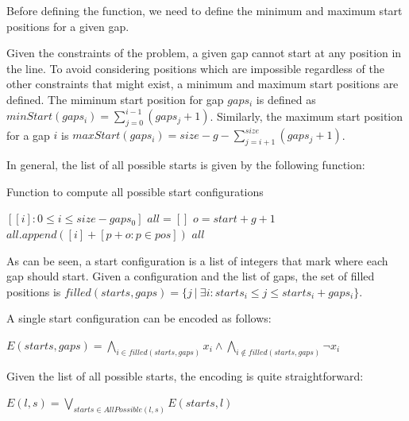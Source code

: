 \documentclass[12pt]{article}
\begin{document}
\noindent Before defining the function, we need to define the minimum and maximum start positions for a given gap.

\noindent Given the constraints of the problem, a given gap cannot start at any position in the line.
To avoid considering positions which are impossible regardless of the other constraints that might exist, a minimum and maximum start positions are defined.
The miminum start position for gap $gaps_i$ is defined as $minStart(gaps_i) = \sum_{j = 0}^{i-1}(gaps_{j}+ 1)$. Similarly, the maximum start position for a gap $i$ is $maxStart(gaps_i) = size - g - \sum_{j=i+1}^{size}(gaps_{j} + 1)$.

In general, the list of all possible starts is given by the following function:

\begin{algorithm}
\caption{Function to compute all possible start configurations}\label{alg:allPossible}
\begin{algorithmic}
    \State \Return $[ [i]: 0 \le i \le size - gaps_0]$
  \Else
    \State $all = []$
      \State $o = start + g + 1$ 
          \State $all.append([i] + [p + o: p \in pos])$
      \EndFor
    \EndFor
    \State \Return $all$
  \EndIf
\EndFunction
\end{algorithmic}
\end{algorithm}

As can be seen, a start configuration is a list of integers that mark where each gap should start.
Given a configuration and the list of gaps, the set of filled positions is $filled(starts, gaps) = \{j\ |\ \exists i: starts_i \le j \le starts_i + gaps_i\}$.

A single start configuration can be encoded as follows:

\begin{center}
  $E(starts, gaps) = \bigwedge\limits_{i \in filled(starts, gaps)}x_i \wedge \bigwedge\limits_{i \notin filled(starts, gaps)} \neg x_i$
\end{center}

\noindent Given the list of all possible starts, the encoding is quite straightforward:

\begin{center}
  $E(l, s) = \bigvee_{starts \in AllPossible(l, s)} E(starts, l)$
\end{center}
\end{document}

